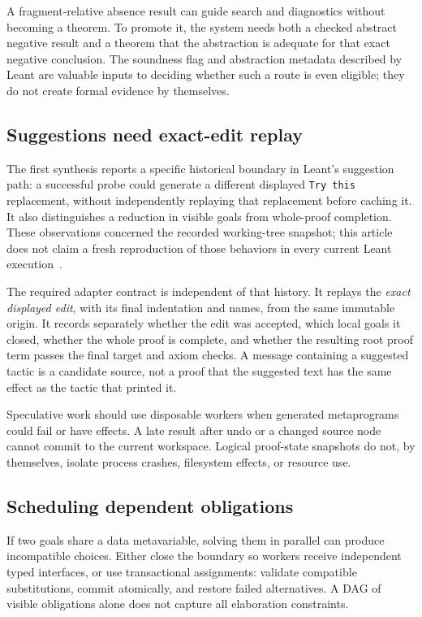 \documentclass[11pt,letterpaper]{article}
\newcommand{\code}[1]{\nolinkurl{#1}}
\theoremstyle{definition}
\theoremstyle{remark}
\begin{document}
A fragment-relative absence result can guide search and diagnostics without
becoming a theorem. To promote it, the system needs both a checked abstract
negative result and a theorem that the abstraction is adequate for that exact
negative conclusion. The soundness flag and abstraction metadata described by
Leant are valuable inputs to deciding whether such a route is even eligible;
they do not create formal evidence by themselves.

\subsection{Suggestions need exact-edit replay}
The first synthesis reports a specific historical boundary in Leant's
suggestion path: a successful probe could generate a different displayed
\code{Try this} replacement, without independently replaying that replacement
before caching it. It also distinguishes a reduction in visible goals from
whole-proof completion. These observations concerned the recorded working-tree
snapshot; this article does not claim a fresh reproduction of those behaviors
in every current Leant execution~\cite{synthesis}.

The required adapter contract is independent of that history. It replays the
\emph{exact displayed edit}, with its final indentation and names, from the
same immutable origin. It records separately whether the edit was accepted,
which local goals it closed, whether the whole proof is complete, and whether
the resulting root proof term passes the final target and axiom checks.
A message containing a suggested tactic is a candidate source, not a proof
that the suggested text has the same effect as the tactic that printed it.

Speculative work should use disposable workers when generated metaprograms
could fail or have effects. A late result after undo or a changed source node
cannot commit to the current workspace. Logical proof-state snapshots do not,
by themselves, isolate process crashes, filesystem effects, or resource use.

\subsection{Scheduling dependent obligations}
If two goals share a data metavariable, solving them in parallel can produce
incompatible choices. Either close the boundary so workers receive independent
typed interfaces, or use transactional assignments: validate compatible
substitutions, commit atomically, and restore failed alternatives. A DAG of
visible obligations alone does not capture all elaboration constraints.
\end{document}
